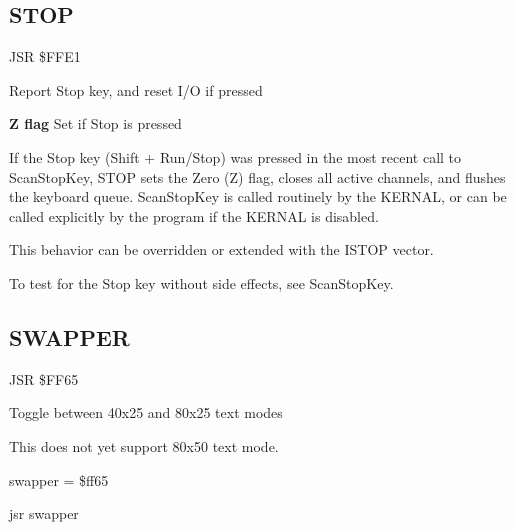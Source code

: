 \subsection{STOP}
\label{KERNAL Jump Table!STOP}
\begin{description}[leftmargin=2cm,style=nextline]
    \item [Address:] JSR \$FFE1
    \item [Description:] Report Stop key, and reset I/O if pressed
    \item [Outputs:]
        \textbf{Z flag} Set if Stop is pressed
    \item [Remarks:]
        If the Stop key (Shift + Run/Stop) was pressed in the most recent call to ScanStopKey, STOP sets the Zero (Z) flag, closes all active channels, and flushes the keyboard queue. ScanStopKey is called routinely by the KERNAL, or can be called explicitly by the program if the KERNAL is disabled.

        This behavior can be overridden or extended with the ISTOP vector.

        To test for the Stop key without side effects, see ScanStopKey.
    \item [Example:]
\end{description}



\newpage
\subsection{SWAPPER}
\label{KERNAL Jump Table!SWAPPER}
\begin{description}[leftmargin=2cm,style=nextline]
    \item [Address:] JSR \$FF65
    \item [Description:] Toggle between 40x25 and 80x25 text modes
    \item [Remarks:]
        This does not yet support 80x50 text mode.
    \item [Example:]
        \begin{asmcode}
swapper = \$ff65

    jsr swapper
        \end{asmcode}
\end{description}


